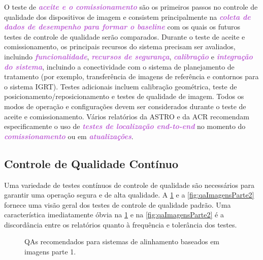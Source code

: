 \documentclass[11pt,a4paper]{article}
\newcounter{exemplo}
\begin{document}
    O teste de \textcolor{MediumOrchid}{\textbf{\textit{aceite e o comissionamento}}} são os primeiros passos no controle de qualidade dos dispositivos de imagem e consistem principalmente na \textcolor{MediumOrchid}{\textbf{\textit{coleta de dados de desempenho para formar o baseline}}} com os quais os futuros testes de controle de qualidade serão comparados. Durante o teste de aceite e comissionamento, os principais recursos do sistema precisam ser avaliados, incluindo \textcolor{MediumOrchid}{\textbf{\textit{funcionalidade}}}, \textcolor{MediumOrchid}{\textbf{\textit{recursos de segurança}}}, \textcolor{MediumOrchid}{\textbf{\textit{calibração}}} e \textcolor{MediumOrchid}{\textbf{\textit{integração do sistema}}}, incluindo a conectividade com o sistema de planejamento de tratamento (por exemplo, transferência de imagens de referência e contornos para o sistema IGRT). Testes adicionais incluem calibração geométrica, teste de posicionamento/reposicionamento e testes de qualidade de imagem. Todos os modos de operação e configurações devem ser considerados durante o teste de aceite e comissionamento. Vários relatórios da ASTRO e da ACR recomendam especificamente o uso de \textcolor{MediumOrchid}{\textbf{\textit{testes de localização end-to-end}}} no momento do\textcolor{MediumOrchid}{\textbf{\textit{ comissionamento}}} ou em \textcolor{MediumOrchid}{\textbf{\textit{atualizações}}}.

\subsection*{Controle de Qualidade Contínuo}

    Uma variedade de testes contínuos de controle de qualidade são necessários para garantir uma operação segura e de alta qualidade. A \ref{fig:qaImagensParte1} e a \ref{fig:qaImagensParte2} fornece uma visão geral dos testes de controle de qualidade padrão. Uma característica imediatamente óbvia na \ref{fig:qaImagensParte1} e na \ref{fig:qaImagensParte2} é a discordância entre os relatórios quanto à frequência e tolerância dos testes.

    \begin{figure}[!h]
        \centering
        \caption{QAs recomendados para sistemas de alinhamento baseados em imagens parte 1.}
        \label{fig:qaImagensParte1}
    \end{figure}
\end{document}
